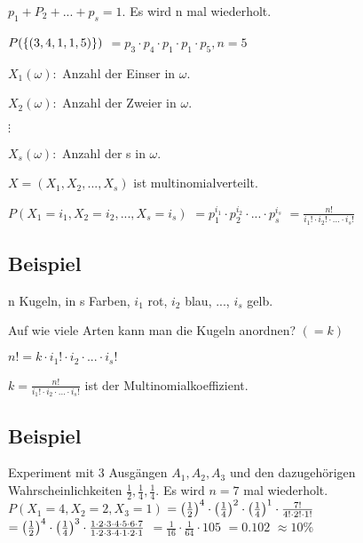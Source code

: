 $p_1+P_2+...+p_s=1$. Es wird n mal wiederholt. 

$P( \left\lbrace (3,4,1,1,5) \right\rbrace )$
$=p_3\cdot p_4\cdot p_1\cdot p_1\cdot p_5, n=5 $

$X_1(\omega): $ Anzahl der Einser in $\omega$. 

$X_2(\omega): $ Anzahl der Zweier in $\omega$.

$\vdots$

$X_s(\omega): $ Anzahl der s in $\omega$.

$X=(X_1, X_2, ..., X_s)$ ist multinomialverteilt. 

$P(X_1=i_1, X_2=i_2, ..., X_s=i_s)$
$=p_1^{i_1} \cdot p_2^{i_2} \cdot ... \cdot p_s^{i_s} $
$=\frac{n!}{i_1! \cdot i_2! \cdot ... \cdot i_s!}$

\subsection{Beispiel}
n Kugeln, in s Farben, $i_1$ rot, $i_2$ blau, ..., $i_s$ gelb. 

Auf wie viele Arten kann man die Kugeln anordnen? $(=k)$

$n! = k\cdot i_1! \cdot i_2 \cdot ... \cdot i_s!$

$k= \frac{n!}{i_1! \cdot i_2 \cdot ... \cdot i_s!}$ ist der Multinomialkoeffizient. 

\subsection{Beispiel}
Experiment mit 3 Ausgängen $A_1, A_2, A_3$ und den dazugehörigen Wahrscheinlichkeiten $\frac{1}{2}, \frac{1}{4}, \frac{1}{4}$. Es wird $n=7$ mal wiederholt. 
$P(X_1=4, X_2=2, X_3=1)$
$= \left( \frac{1}{2} \right) ^4 \cdot  \left( \frac{1}{4} \right) ^2 \cdot  \left( \frac{1}{4} \right) ^1 \cdot \frac{7!}{4!\cdot 2! \cdot 1!}$
$= \left( \frac{1}{2} \right) ^4 \cdot  \left( \frac{1}{4} \right) ^3 \cdot \frac{1\cdot 2\cdot 3\cdot 4\cdot 5\cdot 6\cdot 7}{1\cdot 2\cdot 3\cdot 4\cdot 1\cdot 2\cdot 1}$
$=\frac{1}{16} \cdot \frac{1}{64} \cdot 105$
$=0.102$
$\approx 10 \%$